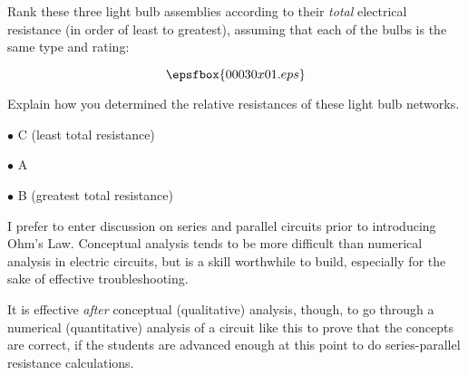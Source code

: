 

Rank these three light bulb assemblies according to their {\it total} electrical resistance (in order of least to greatest), assuming that each of the bulbs is the same type and rating:

$$\epsfbox{00030x01.eps}$$

Explain how you determined the relative resistances of these light bulb networks.







\medskip
\item{$\bullet$} C (least total resistance)
\item{$\bullet$} A
\item{$\bullet$} B (greatest total resistance)
\medskip







I prefer to enter discussion on series and parallel circuits prior to introducing Ohm's Law.  Conceptual analysis tends to be more difficult than numerical analysis in electric circuits, but is a skill worthwhile to build, especially for the sake of effective troubleshooting.

It is effective {\it after} conceptual (qualitative) analysis, though, to go through a numerical (quantitative) analysis of a circuit like this to prove that the concepts are correct, if the students are advanced enough at this point to do series-parallel resistance calculations.




